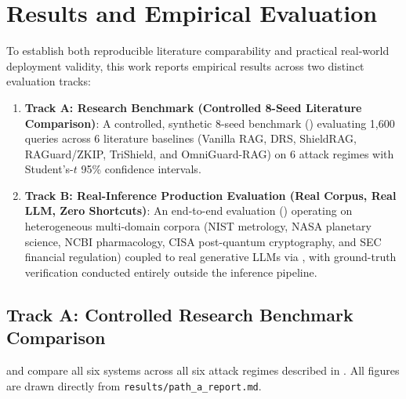 \section{Results and Empirical Evaluation}
\label{sec:results}

To establish both reproducible literature comparability and practical real-world deployment validity, this work reports empirical results across two distinct evaluation tracks:

\begin{enumerate}
\item \textbf{Track A: Research Benchmark (Controlled 8-Seed Literature Comparison)}:
  A controlled, synthetic 8-seed benchmark () evaluating 1{,}600 queries across 6 literature baselines (Vanilla RAG, DRS, ShieldRAG, RAGuard/ZKIP, TriShield, and OmniGuard-RAG) on 6 attack regimes with Student's-$t$ 95\% confidence intervals.
\item \textbf{Track B: Real-Inference Production Evaluation (Real Corpus, Real LLM, Zero Shortcuts)}:
  An end-to-end evaluation () operating on heterogeneous multi-domain corpora (NIST metrology, NASA planetary science, NCBI pharmacology, CISA post-quantum cryptography, and SEC financial regulation) coupled to real generative LLMs via , with ground-truth verification conducted entirely outside the inference pipeline.
\end{enumerate}

\subsection{Track A: Controlled Research Benchmark Comparison}

 and  compare all six systems across all six attack regimes described in . All figures are drawn directly from \texttt{results/path\allowbreak\_a\allowbreak\_report.md}.

